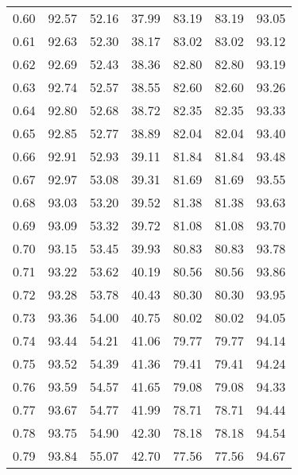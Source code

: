 \begin{tabular}{|c|c|c|c|c|c|c|}
      0.60 &     92.57 &     52.16 &      37.99 &   83.19 &      83.19 &         93.05 \\
      0.61 &     92.63 &     52.30 &      38.17 &   83.02 &      83.02 &         93.12 \\
      0.62 &     92.69 &     52.43 &      38.36 &   82.80 &      82.80 &         93.19 \\
      0.63 &     92.74 &     52.57 &      38.55 &   82.60 &      82.60 &         93.26 \\
      0.64 &     92.80 &     52.68 &      38.72 &   82.35 &      82.35 &         93.33 \\
      0.65 &     92.85 &     52.77 &      38.89 &   82.04 &      82.04 &         93.40 \\
      0.66 &     92.91 &     52.93 &      39.11 &   81.84 &      81.84 &         93.48 \\
      0.67 &     92.97 &     53.08 &      39.31 &   81.69 &      81.69 &         93.55 \\
      0.68 &     93.03 &     53.20 &      39.52 &   81.38 &      81.38 &         93.63 \\
      0.69 &     93.09 &     53.32 &      39.72 &   81.08 &      81.08 &         93.70 \\
      0.70 &     93.15 &     53.45 &      39.93 &   80.83 &      80.83 &         93.78 \\
      0.71 &     93.22 &     53.62 &      40.19 &   80.56 &      80.56 &         93.86 \\
      0.72 &     93.28 &     53.78 &      40.43 &   80.30 &      80.30 &         93.95 \\
      0.73 &     93.36 &     54.00 &      40.75 &   80.02 &      80.02 &         94.05 \\
      0.74 &     93.44 &     54.21 &      41.06 &   79.77 &      79.77 &         94.14 \\
      0.75 &     93.52 &     54.39 &      41.36 &   79.41 &      79.41 &         94.24 \\
      0.76 &     93.59 &     54.57 &      41.65 &   79.08 &      79.08 &         94.33 \\
      0.77 &     93.67 &     54.77 &      41.99 &   78.71 &      78.71 &         94.44 \\
      0.78 &     93.75 &     54.90 &      42.30 &   78.18 &      78.18 &         94.54 \\
      0.79 &     93.84 &     55.07 &      42.70 &   77.56 &      77.56 &         94.67 \\

\end{tabular}

